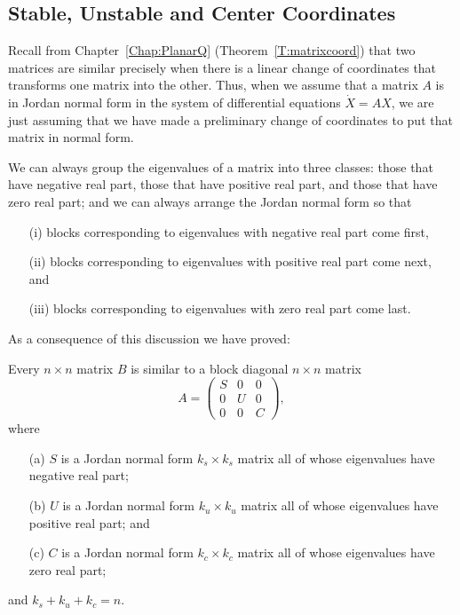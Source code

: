 \documentclass{ximera}
\begin{document}
\subsection*{Stable, Unstable and Center Coordinates}

Recall from Chapter~\ref{Chap:PlanarQ} (Theorem~\ref{T:matrixcoord}) that 
two matrices are similar 
precisely when there is a linear change of 
coordinates that transforms
one matrix into the other.  Thus, when we assume that a matrix $A$ is in 
Jordan normal form in the system of differential 
equations $\dot{X}=AX$, 
we are just assuming that we have made a preliminary change of coordinates
to put that matrix in normal form. 

We can always group the eigenvalues of a matrix into three classes: those 
that have negative real part, 
those that have positive real part, 
and those that have zero real part; and 
we can always arrange the Jordan normal form so 
that 
\begin{itemize}
\item[(i)] blocks corresponding to eigenvalues with negative real part come first,
\item[(ii)] blocks corresponding to eigenvalues with positive real part come 
next, and
\item[(iii)] blocks corresponding to eigenvalues with zero real part come last.
\end{itemize}
As a consequence of this discussion we have proved:
\begin{proposition}  \label{P:SUC}
Every $n\times n$ matrix $B$ is similar to a 
block diagonal $n\times n$ matrix
\begin{equation} \label{e:SUC}
A = \left(\begin{array}{ccc} S & 0 & 0 \\ 0 & U & 0\\ 0 & 0 & C \end{array}
\right),
\end{equation}
where
\begin{itemize}
\item[(a)]	$S$ is a Jordan normal form
$k_s\times k_s$ matrix all of whose eigenvalues have negative real part;
\item[(b)]	$U$ is a Jordan normal form $k_u\times k_u$ matrix all
of whose eigenvalues have positive real part; and
\item[(c)]	$C$ is a Jordan normal form $k_c\times k_c$ matrix all
of whose eigenvalues have zero real part;
\end{itemize}
and $k_s+k_u+k_c=n$.
\end{proposition}
\end{document}

